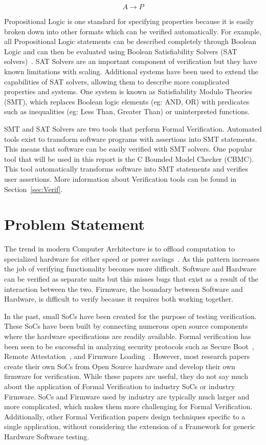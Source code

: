 \begin{equation}
    A \to P
\end{equation}

Propositional Logic is one standard for specifying properties because it is easily
broken down into other formats which can be verified automatically.
For example, all Propositional Logic statements can be described completely
through Boolean Logic and can then be evaluated using Boolean Satisfiability
Solvers (SAT solvers)~\cite{validating-sat}. 
SAT Solvers are an important component of verification but they have known limitations with scaling.
Additional systems have been used to extend the capabilities of SAT solvers, allowing them to describe more complicated properties and systems. 
One system is known as Satisfiability Modulo Theories (SMT), which replaces
Boolean logic elements (eg: AND, OR) with predicates such as inequalities (eg:
Less Than, Greater Than) or uninterpreted functions. 

SMT and SAT Solvers are two tools that perform Formal Verification. 
Automated tools exist to transform software programs with assertions into SMT statements.
This means that software can be easily verified with SMT solvers.
One popular tool that will be used in this report is the C Bounded Model Checker (CBMC). 
This tool automatically transforms software into SMT statements and verifies
user assertions.
More information about Verification tools can be found in
Section~\ref{sec:Verif}. 

\section{Problem Statement}

The trend in modern Computer Architecture is to offload computation to specialized hardware for either speed or power savings~\cite{hardware-accel}.
As this pattern increases the job of verifying functionality becomes more difficult.
Software and Hardware can be verified as separate units but this misses bugs
that exist as a result of the interaction between the two.
Firmware, the boundary between Software and Hardware, is difficult to verify 
because it requires both working together.

In the past, small SoCs have been created for the purpose of testing verification.
These SoCs have been built by connecting numerous open source components where the hardware specifications are readily available.
Formal verification has been seen to be successful in analyzing security
protocols such as Secure Boot~\cite{elane}, Remote
Attestation~\cite{trustfound}, and Firmware Loading~\cite{load-protocol}. 
However, most research papers create their own SoCs from Open Source hardware
and develop their own firmware for verification.
While these papers are useful, they do not say much about the application of
Formal Verification to industry SoCs or industry Firmware.
SoCs and Firmware used by industry are typically much larger and more
complicated, which makes them more challenging for Formal Verification.
Additionally, other Formal Verification papers design techniques specific to a
single application, without considering the extension of a Framework for
generic Hardware Software testing.

